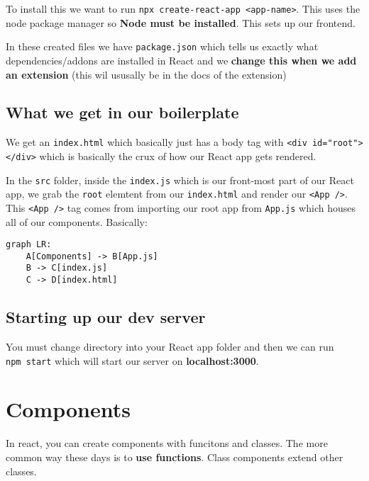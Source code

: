 \documentclass[
]{report}
\begin{document}
To install this we want to run \texttt{npx\ create-react-app\ \textless{}app-name\textgreater{}}. This uses the node package manager so \textbf{Node must be installed}. This sets up our frontend.

In these created files we have \texttt{package.json} which tells us exactly what dependencies/addons are installed in React and we \textbf{change this when we add an extension} (this wil ususally be in the docs of the extension)

\hypertarget{what-we-get-in-our-boilerplate}{%
\subsection{What we get in our boilerplate}\label{what-we-get-in-our-boilerplate}}

We get an \texttt{index.html} which basically just has a body tag with \texttt{\textless{}div\ id="root"\textgreater{}\textless{}/div\textgreater{}} which is basically the crux of how our React app gets rendered.

In the \texttt{src} folder, inside the \texttt{index.js} which is our front-most part of our React app, we grab the \texttt{root} elemtent from our \texttt{index.html} and render our \texttt{\textless{}App\ /\textgreater{}}. This \texttt{\textless{}App\ /\textgreater{}} tag comes from importing our root app from \texttt{App.js} which houses all of our components. Basically:

\begin{verbatim}
graph LR:
    A[Components] -> B[App.js]
    B -> C[index.js]
    C -> D[index.html]
\end{verbatim}

\hypertarget{starting-up-our-dev-server}{%
\subsection{Starting up our dev server}\label{starting-up-our-dev-server}}

You must change directory into your React app folder and then we can run \texttt{npm\ start} which will start our server on \textbf{localhost:3000}.

\hypertarget{components}{%
\section{Components}\label{components}}

In react, you can create components with funcitons and classes. The more common
way these days is to \textbf{use functions}. Class components extend other classes.
\end{document}

